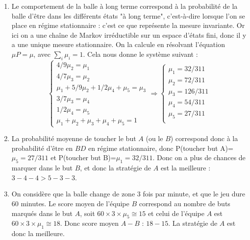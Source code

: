 \documentclass[11pt]{exam}
\begin{document}
\begin{questions}
\begin{parts}
\begin{solution}
\begin{enumerate}
$$\begin{array}{ccccc}
0 & 4/7 & 0 & 3/7 & 0 \\
0 & 0 & 1/2 & 0 & 1/2 \\
0 & 0 & 1 & 0 & 0 \\
\end{array} \right)
$$
\item Le comportement de la balle à long terme correspond à la
probabilité de la balle d'être dans les différents états "à long
terme", c'est-à-dire lorsque l'on se place en régime stationnaire
: c'est ce que représente la mesure invariante. Or ici on a une
chaîne de Markov irréductible sur un espace d'états fini, donc il
y a une unique mesure stationnaire. On la calcule en résolvant
l'équation $\mu P=\mu$, avec $\sum_i \mu_i = 1$. Cela nous donne
le système suivant :
$$
\left\{
\begin{array}{c}
4/9\mu_2=\mu_1 \\
4/7\mu_3=\mu_2 \\
\mu_1+5/9\mu_2+1/2\mu_4+\mu_5=\mu_3 \\
3/7\mu_3=\mu_4 \\
1/2\mu_4=\mu_5 \\
\mu_1+\mu_2+\mu_3+\mu_4+\mu_5=1
\end{array}\right.
\Rightarrow \left\{ \begin{array}{c}
\mu_1= 32/311\\
\mu_2=72/311 \\
\mu_3=126/311 \\
\mu_4=54/311 \\
\mu_5=27/311 \\
\end{array}
\right.$$ \item La probabilité moyenne de toucher le but $A$ (ou
le $B$) correspond donc à la probabilité d'être en $BD$ en régime
stationnaire, donc P(toucher but A)=$\mu_5=27/311$ et P(toucher
but B)=$\mu_1=32/311$. Donc on a plus de chances de marquer dans
le but $B$, et donc la stratégie de $A$ est la meilleure : $3-4-4
> 5-3-3$.


\item On considère que la balle change de zone $3$ fois par
minute, et que le jeu dure $60$ minutes. Le score moyen de
l'équipe $B$ correspond au nombre de buts marqués dans le but $A$,
soit $60 \times 3 \times \mu_5 \cong 15$ et celui de l'équipe $A$ est
$60 \times 3\times \mu_1\cong 18$. Donc score moyen $A-B$ :
$18-15$. La stratégie de $A$ est donc la meilleure.
\end{enumerate}

\end{solution}

\end{parts}
\end{questions}
\end{document}
